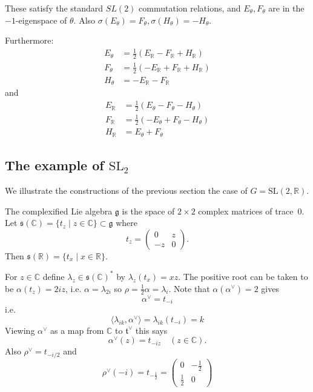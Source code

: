 \documentclass[10pt,leqno]{article}
\numberwithin{equation}{section}
\newcommand{\R}{\mathbb R}
\newcommand{\C}{\mathbb C}
\newcommand{\ch}[1]{#1^\vee}
\newcommand{\g}{\mathfrak g}
\newcommand{\SL}{\text{SL}}
\newcommand{\s}{\mathfrak s}
\begin{document}
These satisfy the standard $SL(2)$ commutation relations, and $E_\theta,F_\theta$ are in the $-1$-eigenspace of $\theta$.
Also $\sigma(E_\theta)=F_\theta,\sigma(H_\theta)=-H_\theta$.

Furthermore:
$$
\begin{aligned}
  E_\theta&=\frac12(E_\R-F_\R+H_\R)\\
  F_\theta&=\frac12(-E_\R+F_\R+H_\R)\\
  H_\theta&=-E_\R-F_\R
\end{aligned}
$$
and
$$
\begin{aligned}
  E_\R&=\frac12(E_\theta-F_\theta-H_\theta)\\
  F_\R&=\frac12(-E_\theta+F_\theta-H_\theta)\\
  H_\R&=E_\theta+F_\theta
\end{aligned}
$$

\subsection{The example of $\text{SL}_2$}

We illustrate the constructions of the previous section the case of $G=\SL(2,\R)$. 

The complexified Lie algebra $\g$ is the space of $2\times 2$ complex matrices of trace~$0$. Let $\s(\C)=\{t_z\mid z\in\C\}\subset \g$ where
$$
t_z=\begin{pmatrix}0&z\\-z&0
\end{pmatrix}.
$$
Then $\s(\R)=\{t_x\mid x\in\R\}$.

For $z\in \C$ define $\lambda_z\in \s(\C)^*$ by $\lambda_z(t_x)=xz$.
The positive root can be taken to be   $\alpha(t_z)=2iz$, i.e.
$\alpha=\lambda_{2i}$ so $\rho=\frac12\alpha=\lambda_i$.
Note that $\alpha(\ch\alpha)=2$ gives
$$
\ch\alpha=t_{-i}
$$
i.e.
$$
\langle \lambda_{ik},\ch\alpha\rangle=\lambda_{ik}(t_{-i})=k
$$
Viewing $\ch\alpha$ as a map from $\C$ to $\ch{\mathfrak t}$ this says
$$
\ch\alpha(z)=t_{-iz}\quad (z\in \C).
$$
Also $\ch\rho=t_{-i/2}$
and
$$
\ch\rho(-i)=t_{-\frac 12}=\begin{pmatrix}0&-\frac 12\\\frac 12&0
\end{pmatrix}
$$
\end{document}
